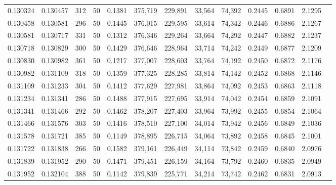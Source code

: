 \begin{tabular}{rrrrrrrrrrrrr}
0.130324 & 0.130457 &   312 &  50 &                                     0.1381 & 375,719 & 229,891 &  33,564 &  74,392 & 0.2445 & 0.6891 & 2.1295 \\
0.130458 & 0.130581 &   296 &  50 &                                     0.1445 & 376,015 & 229,595 &  33,614 &  74,342 & 0.2446 & 0.6886 & 2.1267 \\
0.130581 & 0.130717 &   331 &  50 &                                     0.1312 & 376,346 & 229,264 &  33,664 &  74,292 & 0.2447 & 0.6882 & 2.1237 \\
0.130718 & 0.130829 &   300 &  50 &                                     0.1429 & 376,646 & 228,964 &  33,714 &  74,242 & 0.2449 & 0.6877 & 2.1209 \\
0.130830 & 0.130982 &   361 &  50 &                                     0.1217 & 377,007 & 228,603 &  33,764 &  74,192 & 0.2450 & 0.6872 & 2.1176 \\
0.130982 & 0.131109 &   318 &  50 &                                     0.1359 & 377,325 & 228,285 &  33,814 &  74,142 & 0.2452 & 0.6868 & 2.1146 \\
0.131109 & 0.131233 &   304 &  50 &                                     0.1412 & 377,629 & 227,981 &  33,864 &  74,092 & 0.2453 & 0.6863 & 2.1118 \\
0.131234 & 0.131341 &   286 &  50 &                                     0.1488 & 377,915 & 227,695 &  33,914 &  74,042 & 0.2454 & 0.6859 & 2.1091 \\
0.131341 & 0.131466 &   292 &  50 &                                     0.1462 & 378,207 & 227,403 &  33,964 &  73,992 & 0.2455 & 0.6854 & 2.1064 \\
0.131466 & 0.131576 &   303 &  50 &                                     0.1416 & 378,510 & 227,100 &  34,014 &  73,942 & 0.2456 & 0.6849 & 2.1036 \\
0.131578 & 0.131721 &   385 &  50 &                                     0.1149 & 378,895 & 226,715 &  34,064 &  73,892 & 0.2458 & 0.6845 & 2.1001 \\
0.131722 & 0.131838 &   266 &  50 &                                     0.1582 & 379,161 & 226,449 &  34,114 &  73,842 & 0.2459 & 0.6840 & 2.0976 \\
0.131839 & 0.131952 &   290 &  50 &                                     0.1471 & 379,451 & 226,159 &  34,164 &  73,792 & 0.2460 & 0.6835 & 2.0949 \\
0.131952 & 0.132104 &   388 &  50 &                                     0.1142 & 379,839 & 225,771 &  34,214 &  73,742 & 0.2462 & 0.6831 & 2.0913 \\

\end{tabular}
